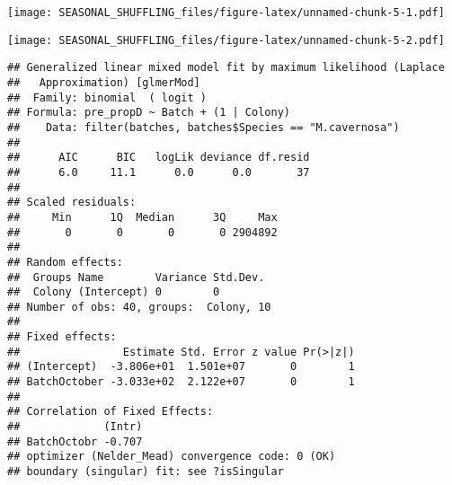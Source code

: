 \documentclass[]{article}
\newenvironment{Shaded}{\begin{snugshade}}{\end{snugshade}}
\newcommand{\CommentTok}[1]{\textcolor[rgb]{0.56,0.35,0.01}{\textit{#1}}}
\newcommand{\DataTypeTok}[1]{\textcolor[rgb]{0.13,0.29,0.53}{#1}}
\newcommand{\DecValTok}[1]{\textcolor[rgb]{0.00,0.00,0.81}{#1}}
\newcommand{\KeywordTok}[1]{\textcolor[rgb]{0.13,0.29,0.53}{\textbf{#1}}}
\newcommand{\NormalTok}[1]{#1}
\newcommand{\OperatorTok}[1]{\textcolor[rgb]{0.81,0.36,0.00}{\textbf{#1}}}
\newcommand{\StringTok}[1]{\textcolor[rgb]{0.31,0.60,0.02}{#1}}
\begin{document}
\texttt{[image: SEASONAL\_SHUFFLING\_files/figure-latex/unnamed-chunk-5-1.pdf]}

\begin{Shaded}
\end{Shaded}

\texttt{[image: SEASONAL\_SHUFFLING\_files/figure-latex/unnamed-chunk-5-2.pdf]}

\begin{Shaded}
\end{Shaded}

\begin{verbatim}
## Generalized linear mixed model fit by maximum likelihood (Laplace
##   Approximation) [glmerMod]
##  Family: binomial  ( logit )
## Formula: pre_propD ~ Batch + (1 | Colony)
##    Data: filter(batches, batches$Species == "M.cavernosa")
## 
##      AIC      BIC   logLik deviance df.resid 
##      6.0     11.1      0.0      0.0       37 
## 
## Scaled residuals: 
##     Min      1Q  Median      3Q     Max 
##       0       0       0       0 2904892 
## 
## Random effects:
##  Groups Name        Variance Std.Dev.
##  Colony (Intercept) 0        0       
## Number of obs: 40, groups:  Colony, 10
## 
## Fixed effects:
##                Estimate Std. Error z value Pr(>|z|)
## (Intercept)  -3.806e+01  1.501e+07       0        1
## BatchOctober -3.033e+02  2.122e+07       0        1
## 
## Correlation of Fixed Effects:
##             (Intr)
## BatchOctobr -0.707
## optimizer (Nelder_Mead) convergence code: 0 (OK)
## boundary (singular) fit: see ?isSingular
\end{verbatim}

\begin{Shaded}
\end{Shaded}
\end{document}
